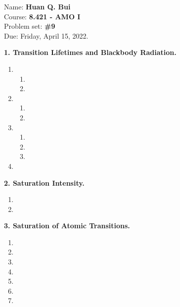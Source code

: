 \documentclass{article}
\theoremstyle{definition}
\begin{document}
\begin{framed}
\noindent Name: \textbf{Huan Q. Bui}\\
Course: \textbf{8.421 - AMO I}\\
Problem set: \textbf{\#9}\\
Due: Friday, April 15, 2022.
\end{framed}



\textbf{1. Transition Lifetimes and Blackbody Radiation. }

\begin{enumerate}[label=(\alph*)]
	\item 
	
	\begin{enumerate}[label=(\roman*)]
		\item 
		
		\item 
	\end{enumerate}
	
	\item 
	
	\begin{enumerate}[label=(\roman*)]
		\item 
		
		\item 
	\end{enumerate}
	
	\item 
	
	\begin{enumerate}[label=(\roman*)]
		\item 
		
		\item 
		
		\item 
	\end{enumerate}
	
	\item 

\end{enumerate}


\textbf{2. Saturation Intensity.}

\begin{enumerate}[label=(\alph*)]
	\item 
	
	\item 
	
\end{enumerate}


\textbf{3. Saturation of Atomic Transitions.}

\begin{enumerate}[label=(\alph*)]
	\item 
	
	\item 
	
	\item 
	
	\item 
	
	\item 
	
	\item 
	
	\item 
\end{enumerate}

	
	
\end{document}
